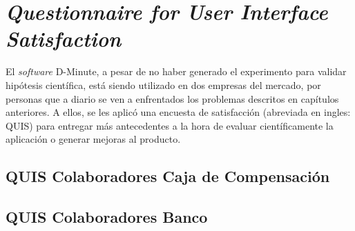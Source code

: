 \section{\textit{Questionnaire for User Interface Satisfaction}}

El \textit{software} D-Minute, a pesar de no haber generado el experimento para validar hipótesis científica, está siendo utilizado en dos empresas del mercado, por personas que a diario se ven a enfrentados los problemas descritos en capítulos anteriores. A ellos, se les aplicó una encuesta de satisfacción (abreviada en ingles: QUIS) para entregar más antecedentes a la hora de evaluar científicamente la aplicación o generar mejoras al producto.

\subsection{QUIS Colaboradores Caja de Compensación}



\subsection{QUIS Colaboradores Banco}



